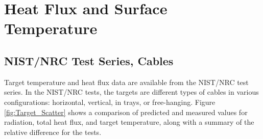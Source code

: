 \chapter{Heat Flux and Surface Temperature}

\section{NIST/NRC Test Series, Cables}

Target temperature and heat flux data are available from the NIST/NRC test series.  In the NIST/NRC tests, the targets are different types of cables in various configurations: horizontal, vertical, in trays, or free-hanging.  Figure \ref{fig:Target_Scatter} shows a comparison of predicted and measured values for radiation, total heat flux, and target temperature, along with a summary of the relative difference for the tests.

